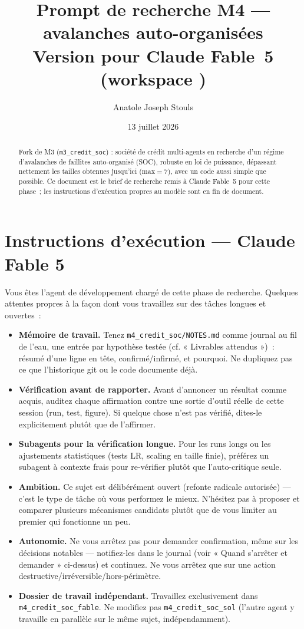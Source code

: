 \documentclass[11pt,a4paper]{article}
\title{Prompt de recherche M4 — avalanches auto-organisées\\
\large Version pour Claude Fable~5 (workspace \Workspace{})}
\author{Anatole Joseph Stouls}
\date{13 juillet 2026}
\newcommand{\code}[1]{\texttt{#1}}
\newcommand{\Workspace}{\code{m4\_credit\_soc\_fable}}
\newcommand{\OtherWorkspace}{\code{m4\_credit\_soc\_sol}}
\begin{document}
\maketitle

\begin{abstract}
Fork de M3 (\code{m3\_credit\_soc}) : société de crédit multi-agents en
recherche d'un régime d'avalanches de faillites auto-organisé (SOC), robuste
en loi de puissance, dépassant nettement les tailles obtenues jusqu'ici
(max$=7$), avec un code aussi simple que possible. Ce document est le brief
de recherche remis à Claude Fable~5 pour cette phase~; les instructions
d'exécution propres au modèle sont en fin de document.
\end{abstract}



\section*{Instructions d'exécution — Claude Fable 5}

Vous êtes l'agent de développement chargé de cette phase de recherche.
Quelques attentes propres à la façon dont vous travaillez sur des tâches
longues et ouvertes~:

\begin{itemize}[leftmargin=*]
  \item \textbf{Mémoire de travail.} Tenez \code{m4\_credit\_soc/NOTES.md}
    comme journal au fil de l'eau, une entrée par hypothèse testée (cf.
    « Livrables attendus »)~: résumé d'une ligne en tête, confirmé/infirmé,
    et pourquoi. Ne dupliquez pas ce que l'historique git ou le code
    documente déjà.
  \item \textbf{Vérification avant de rapporter.} Avant d'annoncer un
    résultat comme acquis, auditez chaque affirmation contre une sortie
    d'outil réelle de cette session (run, test, figure). Si quelque chose
    n'est pas vérifié, dites-le explicitement plutôt que de l'affirmer.
  \item \textbf{Subagents pour la vérification longue.} Pour les runs
    longs ou les ajustements statistiques (tests LR, scaling en taille
    finie), préférez un subagent à contexte frais pour re-vérifier plutôt
    que l'auto-critique seule.
  \item \textbf{Ambition.} Ce sujet est délibérément ouvert (refonte
    radicale autorisée) — c'est le type de tâche où vous performez le
    mieux. N'hésitez pas à proposer et comparer plusieurs mécanismes
    candidats plutôt que de vous limiter au premier qui fonctionne un peu.
  \item \textbf{Autonomie.} Ne vous arrêtez pas pour demander confirmation,
    même sur les décisions notables — notifiez-les dans le journal (voir
    « Quand s'arrêter et demander » ci-dessus) et continuez. Ne vous arrêtez
    que sur une action destructive/irréversible/hors-périmètre.
  \item \textbf{Dossier de travail indépendant.} Travaillez exclusivement
    dans \Workspace{}. Ne modifiez pas \OtherWorkspace{} (l'autre agent y
    travaille en parallèle sur le même sujet, indépendamment).
\end{itemize}
\end{document}

